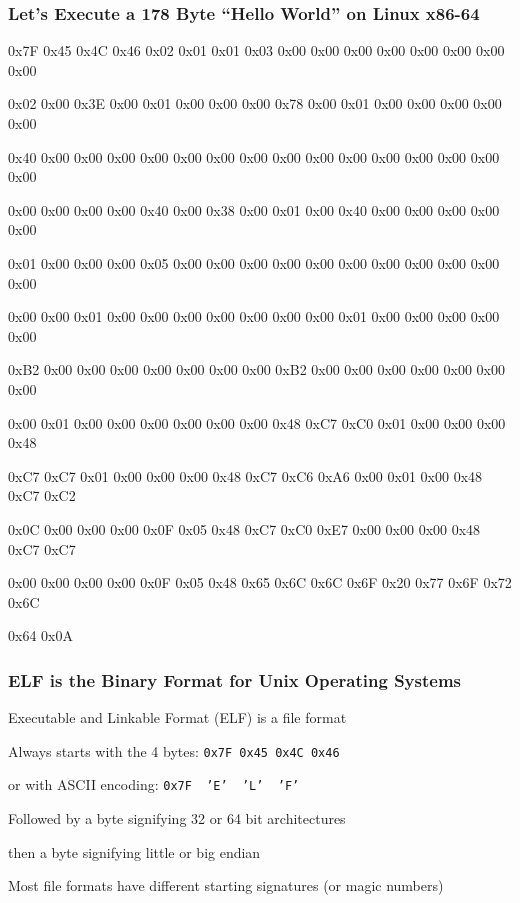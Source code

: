   \begin{frame}
    \frametitle{Let's Execute a 178 Byte ``Hello World'' on Linux x86-64}

    \scriptsize \ttfamily
    0x7F 0x45 0x4C 0x46 0x02 0x01 0x01 0x03 0x00 0x00 0x00 0x00 0x00 0x00 0x00
    0x00

    0x02 0x00 0x3E 0x00 0x01 0x00 0x00 0x00 0x78 0x00 0x01 0x00 0x00 0x00 0x00
    0x00

    0x40 0x00 0x00 0x00 0x00 0x00 0x00 0x00 0x00 0x00 0x00 0x00 0x00 0x00 0x00
    0x00

    0x00 0x00 0x00 0x00 0x40 0x00 0x38 0x00 0x01 0x00 0x40 0x00 0x00 0x00 0x00
    0x00

    0x01 0x00 0x00 0x00 0x05 0x00 0x00 0x00 0x00 0x00 0x00 0x00 0x00 0x00 0x00
    0x00

    0x00 0x00 0x01 0x00 0x00 0x00 0x00 0x00 0x00 0x00 0x01 0x00 0x00 0x00 0x00
    0x00

    0xB2 0x00 0x00 0x00 0x00 0x00 0x00 0x00 0xB2 0x00 0x00 0x00 0x00 0x00 0x00
    0x00

    0x00 0x01 0x00 0x00 0x00 0x00 0x00 0x00 0x48 0xC7 0xC0 0x01 0x00 0x00 0x00
    0x48

    0xC7 0xC7 0x01 0x00 0x00 0x00 0x48 0xC7 0xC6 0xA6 0x00 0x01 0x00 0x48 0xC7
    0xC2

    0x0C 0x00 0x00 0x00 0x0F 0x05 0x48 0xC7 0xC0 0xE7 0x00 0x00 0x00 0x48 0xC7
    0xC7

    0x00 0x00 0x00 0x00 0x0F 0x05 0x48 0x65 0x6C 0x6C 0x6F 0x20 0x77 0x6F 0x72
    0x6C

    0x64 0x0A
  \end{frame}

  \begin{frame}
    \frametitle{ELF is the Binary Format for Unix Operating Systems}

    Executable and Linkable Format (ELF) is a file format

    \vspace{2em}

    Always starts with the 4 bytes: \hspace{0.5em} \texttt{0x7F 0x45 0x4C 0x46}

    \hspace{3em} or with ASCII encoding: \hspace{0.5em}
    \texttt{0x7F~~'E'~~'L'~~'F'}

    \vspace{2em}

    Followed by a byte signifying 32 or 64 bit architectures

    \hspace{2em} then a byte signifying little or big endian

    \vspace{4em}

    Most file formats have different starting signatures (or magic numbers)
  \end{frame}


